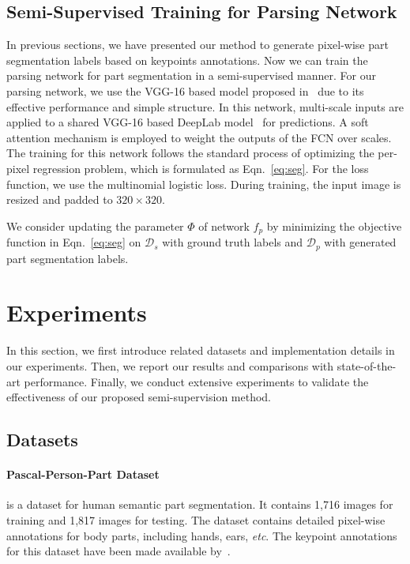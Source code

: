 \documentclass[10pt,twocolumn,letterpaper]{article}
\begin{document}
\subsection{Semi-Supervised Training for Parsing Network}
\vspace{-2mm}
\label{sec:semi}
In previous sections, we have presented our method to generate pixel-wise part segmentation labels based on keypoints annotations. Now we can train the parsing network for part segmentation in a semi-supervised manner. For our parsing network, we use the VGG-16 based model proposed in~\cite{chen2016attention} due to its effective performance and simple structure. In this network, multi-scale inputs are applied to a shared VGG-16 based DeepLab model~\cite{chen2015deeplab} for predictions. A soft attention mechanism is employed to weight the outputs of the FCN over scales. The training for this network follows the standard process of optimizing the per-pixel regression problem, which is formulated as Eqn.~\ref{eq:seg}. For the loss function, we use the multinomial logistic loss. During training, the input image is resized and padded to $320\times 320$.

We consider updating the parameter $\Phi$ of network $f_{p}$ by minimizing the objective function in Eqn.~\ref{eq:seg} on $\mathcal{D}_{s}$ with ground truth labels and $\mathcal{D}_{p}$ with generated part segmentation labels.
\vspace{-2mm}
\section{Experiments}
\vspace{-2mm}
In this section, we first introduce related datasets and implementation details in our experiments. Then, we report our results and comparisons with state-of-the-art performance. Finally, we conduct extensive experiments to validate the effectiveness of our proposed semi-supervision method.
\subsection{Datasets}
\paragraph{Pascal-Person-Part Dataset~\cite{chen2014detect}} is a dataset for human semantic part segmentation. It contains 1,716 images for training and 1,817 images for testing. The dataset contains detailed pixel-wise annotations for body parts, including hands, ears, \emph{etc}. The keypoint annotations for this dataset have been made available by~\cite{xia2017joint}.
\vspace{-3mm}
\end{document}
